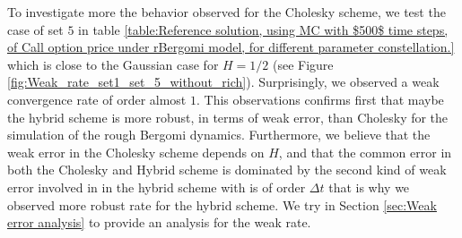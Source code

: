 \documentclass[11pt]{article}
\begin{document}
To investigate more the behavior observed for the Cholesky scheme, we test the case of set $5$ in table \ref{table:Reference solution, using MC with $500$ time steps, of Call option price under rBergomi model, for different parameter constellation.} which is close to the Gaussian case for $H=1/2$ (see Figure \ref{fig:Weak_rate_set1_set_5_without_rich}). Surprisingly, we observed a weak convergence rate of order almost $1$. This observations confirms first that maybe the hybrid scheme is more robust, in terms of weak error, than Cholesky for the simulation of the rough Bergomi dynamics. Furthermore, we believe that the weak error in the Cholesky scheme depends on $H$, and  that the common error in both the Cholesky and Hybrid scheme is dominated by the second kind of weak error involved in  in the hybrid scheme with is of order $\Delta t $ that is why we observed more robust rate for the hybrid scheme. We try in Section \ref{sec:Weak error analysis} to provide an analysis for the weak rate.
\end{document}
